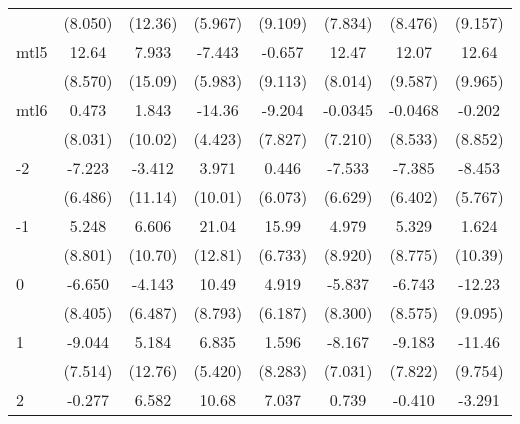 \documentclass{article}
\begin{document}
{\begin{longtable}{l*{7}{c}}
                &  (8.050)         &  (12.36)         &  (5.967)         &  (9.109)         &  (7.834)         &  (8.476)         &  (9.157)         \\
mtl5            &    12.64         &    7.933         &   -7.443         &   -0.657         &    12.47         &    12.07         &    12.64         \\
                &  (8.570)         &  (15.09)         &  (5.983)         &  (9.113)         &  (8.014)         &  (9.587)         &  (9.965)         \\
mtl6            &    0.473         &    1.843         &   -14.36\sym{**} &   -9.204         &  -0.0345         &  -0.0468         &   -0.202         \\
                &  (8.031)         &  (10.02)         &  (4.423)         &  (7.827)         &  (7.210)         &  (8.533)         &  (8.852)         \\
-2              &   -7.223         &   -3.412         &    3.971         &    0.446         &   -7.533         &   -7.385         &   -8.453         \\
                &  (6.486)         &  (11.14)         &  (10.01)         &  (6.073)         &  (6.629)         &  (6.402)         &  (5.767)         \\
-1              &    5.248         &    6.606         &    21.04         &    15.99\sym{*}  &    4.979         &    5.329         &    1.624         \\
                &  (8.801)         &  (10.70)         &  (12.81)         &  (6.733)         &  (8.920)         &  (8.775)         &  (10.39)         \\
0               &   -6.650         &   -4.143         &    10.49         &    4.919         &   -5.837         &   -6.743         &   -12.23         \\
                &  (8.405)         &  (6.487)         &  (8.793)         &  (6.187)         &  (8.300)         &  (8.575)         &  (9.095)         \\
1               &   -9.044         &    5.184         &    6.835         &    1.596         &   -8.167         &   -9.183         &   -11.46         \\
                &  (7.514)         &  (12.76)         &  (5.420)         &  (8.283)         &  (7.031)         &  (7.822)         &  (9.754)         \\
2               &   -0.277         &    6.582         &    10.68         &    7.037         &    0.739         &   -0.410         &   -3.291         \\

\end{longtable}}
\end{document}
